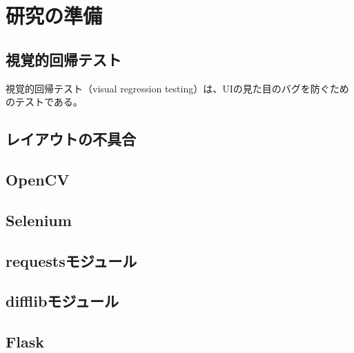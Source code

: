 \chapter{研究の準備}\label{cha:Preparation}

\section{視覚的回帰テスト}\label{sec:vrt}
視覚的回帰テスト（visual regression testing）は、UIの見た目のバグを防ぐためのテストである。

\section{レイアウトの不具合}\label{sec:layout effect}

\section{OpenCV}\label{sec:OpenCV}

\section{Selenium}\label{sec:Selenium}

\section{requestsモジュール}\label{sec:requests}

\section{difflibモジュール}\label{sec:difflib}

\section{Flask}\label{sec:Flask}